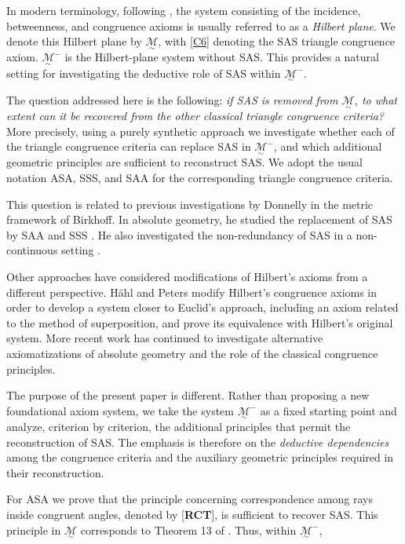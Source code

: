 \documentclass[11pt,a4paper]{article}
\theoremstyle{definition}
\theoremstyle{remark}
\numberwithin{equation}{section}
\newcommand{\MG}{\underset{\sim}{\mathcal{M}}} %
\begin{document}
In modern terminology, following \cite{Hartshorne2000}, the system consisting of the incidence, betweenness, and congruence axioms is usually referred to as a \emph{Hilbert plane}. We denote this Hilbert plane by $\MG$, with \ref{C6} denoting the SAS triangle congruence axiom. $\MG^{-}$ is the Hilbert-plane system without SAS. This provides a natural setting for investigating the deductive role of SAS within $\MG^{-}$.

The question addressed here is the following: \emph{if SAS is removed from $\MG$, to what extent can it be recovered from the other classical triangle congruence criteria?} More precisely, using a purely synthetic approach we investigate whether each of the triangle congruence criteria can replace SAS in $\MG^{-}$, and which additional geometric principles are sufficient to reconstruct SAS. We adopt the usual notation ASA, SSS, and SAA for the corresponding
triangle congruence criteria.

This question is related to previous investigations by Donnelly in the metric framework of Birkhoff. In absolute geometry, he studied the replacement of SAS by SAA and SSS \cite{Donnelly2010,Donnelly2013,Donnelly2015}. He also investigated the non-redundancy of SAS in a non-continuous setting \cite{Donnelly2019}.

Other approaches have considered modifications of Hilbert's axioms from a different perspective. H\"{a}hl and Peters modify Hilbert's congruence axioms in order to develop a system closer to Euclid's approach, including an axiom related to the method of superposition, and prove its equivalence with Hilbert's original system. \cite{HaehlPeters2022} More recent work has continued to investigate alternative axiomatizations of absolute geometry and the role of the classical congruence principles. \cite{EdwardsPambuccian2026}

The purpose of the present paper is different. Rather than proposing a new foundational axiom system, we take the system $\MG^{-}$ as a fixed starting point and analyze, criterion by criterion, the additional principles that permit the reconstruction of SAS. The emphasis is therefore on the \emph{deductive dependencies} among the congruence criteria and the auxiliary geometric principles required in their reconstruction.

For ASA we prove that the principle concerning correspondence among rays inside congruent angles, denoted by [\textbf{RCT}], is sufficient to recover SAS. This principle in $\MG$ corresponds to Theorem 13 of \cite{Hilbert1950}. Thus, within $\MG^{-}$,
\end{document}
